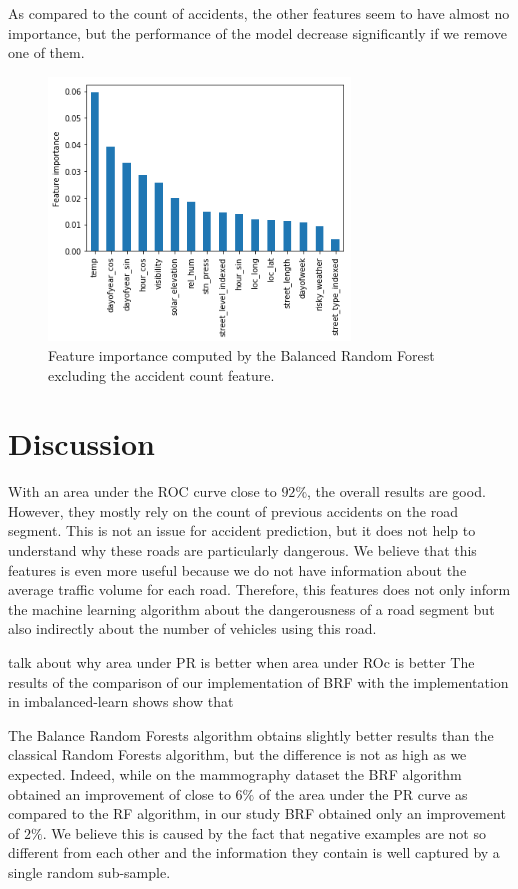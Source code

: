 \documentclass[conference]{IEEEtran}
\newcommand{\todo}[1]{\colorlet{saved}{.}\color{blue}#1\color{saved}}
\begin{document}
As compared to the count of accidents, the other features seem to have almost no
importance, but the performance of the model decrease significantly if we
remove one of them. 

\begin{figure}[htbp]
\centerline{\includegraphics[height=7cm, keepaspectratio]{figures/brf_fi_nocount.png}}
\caption{Feature importance computed by the Balanced Random Forest excluding the accident count feature.}
\label{feature importances}
\end{figure}

\section{Discussion}

With an area under the ROC curve close to $92\%$, the overall results are good.
However, they mostly rely on the count of previous accidents on the road segment. 
This is not an issue for accident prediction, but it does not help to 
understand why these roads are particularly dangerous. We believe that
this features is even more useful because we do not have information
about the average traffic volume for each road. Therefore, this features does
not only inform the machine learning algorithm about the dangerousness of a road
segment but also indirectly about the number of vehicles using this road.

\todo{talk about why area under PR is better when area under ROc is better}
The results of the comparison of our implementation of BRF with the implementation in imbalanced-learn shows show that

The Balance Random Forests algorithm obtains slightly better results than the classical Random Forests algorithm, but the difference is not as high as we expected. Indeed, while on the mammography dataset the BRF algorithm obtained an improvement of close to $6\%$ of the area under the PR curve as compared to the RF algorithm, in our study BRF obtained only an improvement of $2\%$. We believe this is caused by the fact that negative examples are not so
different from each other and the information they contain is well captured
by a single random sub-sample. 
\end{document}
